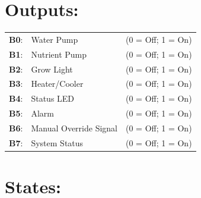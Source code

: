 \documentclass[12pt]{article}
\begin{document}
\section{Outputs:}

\begin{tabular}{ l l l }

   \textbf{B0}: & Water Pump & \quad (0 = Off; 1 = On) \\
   \textbf{B1}: & Nutrient Pump & \quad (0 = Off; 1 = On) \\
   \textbf{B2}: & Grow Light & \quad (0 = Off; 1 = On) \\
   \textbf{B3}: & Heater/Cooler & \quad (0 = Off; 1 = On) \\
   \textbf{B4}: & Status LED & \quad (0 = Off; 1 = On) \\
   \textbf{B5}: & Alarm & \quad (0 = Off; 1 = On) \\
   \textbf{B6}: & Manual Override Signal & \quad (0 = Off; 1 = On) \\
   \textbf{B7}: & System Status & \quad (0 = Off; 1 = On) \\
\end{tabular}

\pagebreak
\section{States:}
\end{document}
